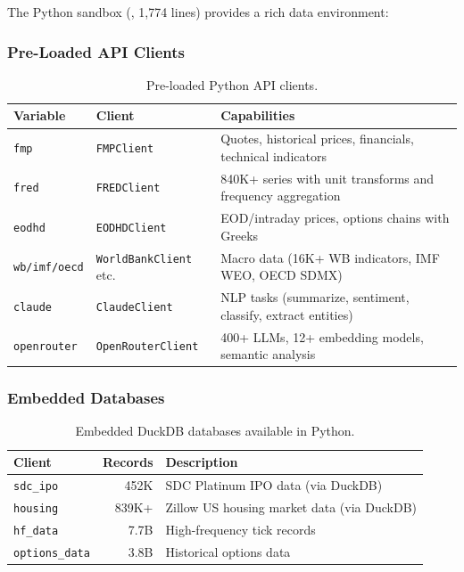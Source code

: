 The Python sandbox (, 1,774 lines) provides a rich data environment:

\subsubsection{Pre-Loaded API Clients}

\begin{table}[H]
\centering
\caption{Pre-loaded Python API clients.}
\label{tab:python-clients}
\begin{tabularx}{\textwidth}{llX}
\toprule
\textbf{Variable} & \textbf{Client} & \textbf{Capabilities} \\
\midrule
\texttt{fmp} & \texttt{FMPClient} & Quotes, historical prices, financials, technical indicators \\
\texttt{fred} & \texttt{FREDClient} & 840K+ series with unit transforms and frequency aggregation \\
\texttt{eodhd} & \texttt{EODHDClient} & EOD/intraday prices, options chains with Greeks \\
\texttt{wb/imf/oecd} & \texttt{WorldBankClient} etc. & Macro data (16K+ WB indicators, IMF WEO, OECD SDMX) \\
\texttt{claude} & \texttt{ClaudeClient} & NLP tasks (summarize, sentiment, classify, extract entities) \\
\texttt{openrouter} & \texttt{OpenRouterClient} & 400+ LLMs, 12+ embedding models, semantic analysis \\
\bottomrule
\end{tabularx}
\end{table}

\subsubsection{Embedded Databases}

\begin{table}[H]
\centering
\caption{Embedded DuckDB databases available in Python.}
\label{tab:embedded-dbs}
\begin{tabularx}{\textwidth}{lrX}
\toprule
\textbf{Client} & \textbf{Records} & \textbf{Description} \\
\midrule
\texttt{sdc\_ipo} & 452K & SDC Platinum IPO data (via DuckDB) \\
\texttt{housing} & 839K+ & Zillow US housing market data (via DuckDB) \\
\texttt{hf\_data} & 7.7B & High-frequency tick records \\
\texttt{options\_data} & 3.8B & Historical options data \\
\bottomrule
\end{tabularx}
\end{table}

